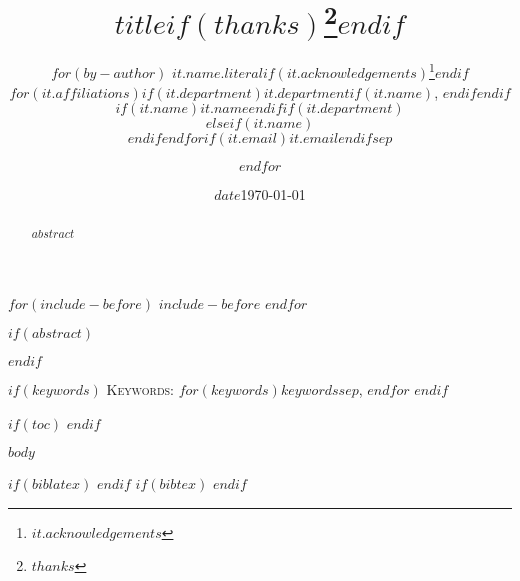 \documentclass[$if(classoption)$$for(classoption)$$classoption$$sep$,$endfor$$if(biblatex)$,bibengine=biblatex$endif$$if(bibtex)$,bibengine=bibtex$endif$$endif$]{grlatex}
\title{$title$$if(thanks)$\thanks{$thanks$}$endif$}
\author{
$for(by-author)$
$it.name.literal$$if(it.acknowledgements)$\thanks{$it.acknowledgements$}$endif$\\
$for(it.affiliations)$$if(it.department)${\small $it.department$}$if(it.name)$, $endif$$endif$$if(it.name)${\small $it.name$}$endif$$if(it.department)$\\$elseif(it.name)$\\$endif$$endfor$$if(it.email)${\small \href{mailto:$it.email$}{$it.email$}}$endif$$sep$\and $endfor$}
\date{$date$}
\date{\today}
\begin{document}
$for(include-before)$
$include-before$
$endfor$
\maketitle

$if(abstract)$
\begin{abstract}
$abstract$
\end{abstract}
$endif$


$if(keywords)$\vspace{0.5em}
\noindent\textsc{Keywords:} $for(keywords)$$keywords$$sep$, $endfor$
$endif$

\clearpage

$if(toc)$
	\tableofcontents
$endif$

$body$

$if(biblatex)$
	\printbibliography
$endif$
$if(bibtex)$
$endif$
\end{document}
